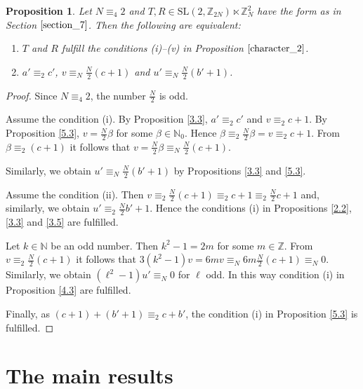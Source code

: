 \documentclass[10pt]{amsart}
\theoremstyle{plain}
\newtheorem{proposition}[theorem]{Proposition}
\theoremstyle{definition}
\theoremstyle{remark}%
\newcommand{\N}{\mathbb{N}}
\newcommand{\Z}{\mathbb{Z}}
\newcommand{\SL}{\mathrm{SL}}
\begin{document}
\begin{proposition}\label{6.3}
 Let $N\equiv_4 2$ and $T,R\in \SL(2,\Z_{2N})\ltimes \Z_{N}^2$ have the form as in Section $\ref{section_7}$. Then the following are equivalent:
 \begin{enumerate}
  \item[(i)] $T$ and $R$ fulfill the conditions (i)--(v) in Proposition $\ref{character_2}$.
  \item[(ii)] $a'\equiv_2 c'$, $v\equiv_N\frac{N}{2}(c+1)$ and $u'\equiv_N\frac{N}{2}(b'+1)$.
 \end{enumerate}
\end{proposition}
\begin{proof}
Since $N\equiv_4 2$, the number $\frac{N}{2}$ is odd.

 Assume the condition (i). By Proposition \ref{3.3}, $a'\equiv_2 c'$ and $v\equiv_2 c+1$. By Proposition \ref{5.3}, $v=\frac{N}{2}\beta$ for some $\beta\in\N_0$. Hence $\beta\equiv_2 \frac{N}{2}\beta=v\equiv_2 c+1$. From $\beta\equiv_2 (c+1)$ it follows that $v=\frac{N}{2}\beta\equiv_{N}\frac{N}{2}(c+1)$.
 
 Similarly, we obtain $u'\equiv_N \frac{N}{2}(b'+1)$ by Propositions \ref{3.3} and \ref{5.3}.
 
  Assume the condition (ii). Then $v\equiv_2\frac{N}{2}(c+1)\equiv_2 c+1\equiv_2\frac{N}{2}c+1$ and, similarly, we obtain $u'\equiv_2\frac{N}{2}b'+1$. Hence the conditions (i) in Propositions \ref{2.2}, \ref{3.3} and \ref{3.5} are fulfilled.
  
  Let $k\in\N$ be an odd number. Then $k^2-1=2m$ for some $m\in\Z$. From $v\equiv_2\frac{N}{2}(c+1)$ it follows that $3(k^2-1)v=6mv\equiv_N 6m\frac{N}{2}(c+1)\equiv_N 0$. Similarly, we obtain $(\ell^2-1)u'\equiv_N 0$ for $\ell$ odd. In this way condition (i) in Proposition \ref{4.3} are fulfilled.
  
  Finally, as $(c+1)+(b'+1)\equiv_2 c+b'$, the condition (i) in Proposition \ref{5.3} is fulfilled. 
\end{proof}





\section{The main results}\label{section_12}
\end{document}
